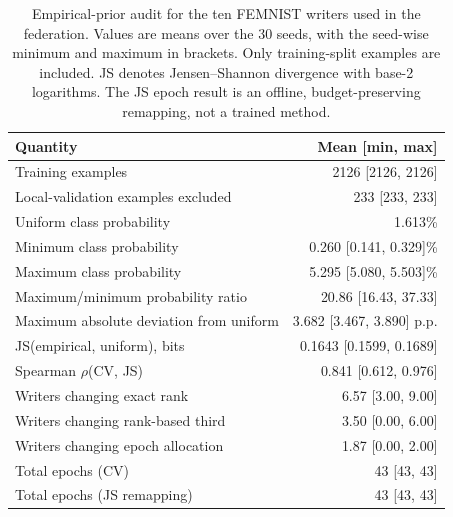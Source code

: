 \begin{table}[t]
\centering
\caption{Empirical-prior audit for the ten FEMNIST writers used in the federation. Values are means over the 30 seeds, with the seed-wise minimum and maximum in brackets. Only training-split examples are included. JS denotes Jensen--Shannon divergence with base-2 logarithms. The JS epoch result is an offline, budget-preserving remapping, not a trained method.}
\label{tab:femnist-ten-writer-prior}
\begin{tabular}{lr}
\toprule
Quantity & Mean [min, max] \\
\midrule
Training examples & 2126 [2126, 2126] \\
Local-validation examples excluded & 233 [233, 233] \\
Uniform class probability & 1.613\% \\
Minimum class probability & 0.260 [0.141, 0.329]\% \\
Maximum class probability & 5.295 [5.080, 5.503]\% \\
Maximum/minimum probability ratio & 20.86 [16.43, 37.33] \\
Maximum absolute deviation from uniform & 3.682 [3.467, 3.890] p.p. \\
JS(empirical, uniform), bits & 0.1643 [0.1599, 0.1689] \\
Spearman $\rho$(CV, JS) & 0.841 [0.612, 0.976] \\
Writers changing exact rank & 6.57 [3.00, 9.00] \\
Writers changing rank-based third & 3.50 [0.00, 6.00] \\
Writers changing epoch allocation & 1.87 [0.00, 2.00] \\
Total epochs (CV) & 43 [43, 43] \\
Total epochs (JS remapping) & 43 [43, 43] \\
\bottomrule
\end{tabular}
\end{table}
